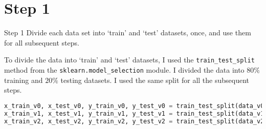 \section*{Step 1}

\begin{custombox}[label={box:Q1}]{Step 1}
	Divide each data set into ‘train’ and ‘test’ datasets, once, and use them for all subsequent steps.
\end{custombox}

To divide the data into `train' and `test' datasets, I used the \texttt{train\_test\_split} method from the \texttt{sklearn.model\_selection} module. I divided the data into $80\%$ training and $20\%$ testing datasets. I used the same split for all the subsequent steps.

\begin{lstlisting}[language=Python, caption=Dividing the Data into Train and Test Datasets]
x_train_v0, x_test_v0, y_train_v0, y_test_v0 = train_test_split(data_v0[['x1','x2']], data_v0['y'], test_size=0.2, random_state=42)
x_train_v1, x_test_v1, y_train_v1, y_test_v1 = train_test_split(data_v1[['x1','x2']], data_v1['y'], test_size=0.2, random_state=42)
x_train_v2, x_test_v2, y_train_v2, y_test_v2 = train_test_split(data_v2[['x1','x2']], data_v2['y'], test_size=0.2, random_state=42)
\end{lstlisting}